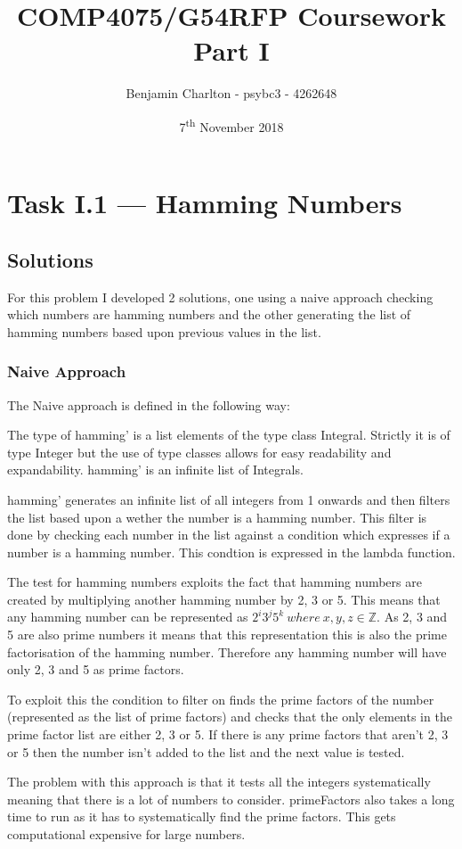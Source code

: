 \documentclass[a4paper]{article}
\title{COMP4075/G54RFP Coursework Part I}
\date{7\textsuperscript{th} November 2018}
\author{Benjamin Charlton - psybc3 - 4262648}
\begin{document}
\maketitle

\section{Task I.1 --- Hamming Numbers}
\subsection{Solutions}
For this problem I developed 2 solutions, one using a naive approach checking which numbers are hamming numbers and the other generating the list of hamming numbers based upon previous values in the list.
\subsubsection{Naive Approach}
The Naive approach is defined in the following way:

\par
The type of hamming' is a list elements of the type class Integral.
Strictly it is of type Integer but the use of type classes allows for easy readability and expandability.
hamming' is an infinite list of Integrals.
\par
hamming' generates an infinite list of all integers from 1 onwards and then filters the list based upon a wether the number is a hamming number.
This filter is done by checking each number in the list against a condition which expresses if a number is a hamming number.
This condtion is expressed in the lambda function.
\par
The test for hamming numbers exploits the fact that hamming numbers are created by multiplying another hamming number by 2, 3 or 5.
This means that any hamming number can be represented as \( 2^i3^j5^k\  where\ x,y,z \in \mathbb{Z} \).
As 2, 3 and 5 are also prime numbers it means that this representation this is also the prime factorisation of the hamming number.
Therefore any hamming number will have only 2, 3 and 5 as prime factors.
\par
To exploit this the condition to filter on finds the prime factors of the number (represented as the list of prime factors) and checks that the only elements in the prime factor list are either 2, 3 or 5.
If there is any prime factors that aren't 2, 3 or 5 then the number isn't added to the list and the next value is tested.
\medskip
\par
The problem with this approach is that it tests all the integers systematically meaning that there is a lot of numbers to consider.
primeFactors also takes a long time to run as it has to systematically find the prime factors.
This gets computational expensive for large numbers.
\end{document}
